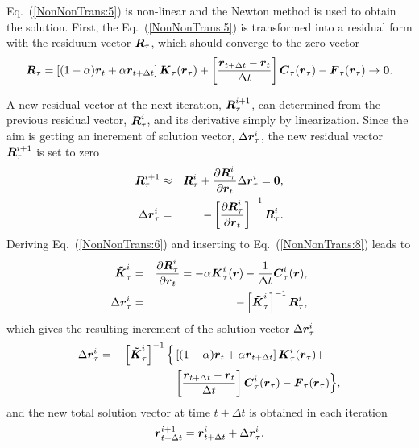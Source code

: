 \documentclass[a4paper]{article}
\newcommand{\mbf}[1]{\mbox{\boldmath$#1$}}
\newcommand{\del}[2]{\mbox{$\displaystyle\frac{#1}{#2}$}}
\newcommand{\refeq}[1]{Eq.~(\ref{#1})}
\begin{document}
\refeq{NonNonTrans:5} is non-linear and the Newton method is used to obtain the solution. First, the \refeq{NonNonTrans:5} is 
transformed into a residual form with the residuum vector $\mbf{R}_{\tau}$, which should converge to the zero vector
\begin{equation}
\mbf{R}_{\tau} = 
\left[(1-\alpha)\mbf{r}_t + \alpha\mbf{r}_{t+\Delta t} \right] \mbf{K}_{\tau}(\mbf{r}_\tau) +
\left[\del{\mbf{r}_{t+\Delta t}-\mbf{r}_t}{\Delta t}\right] \mbf{C}_{\tau}(\mbf{r}_\tau) -
\mbf{F}_{\tau}(\mbf{r}_\tau) \to \mbf{0}.\label{NonNonTrans:6}
\end{equation}

A new residual vector at the next iteration, $\mbf{R}_\tau^{i+1}$, can determined from the previous residual vector, $\mbf{R}_{\tau}^i$, and its derivative simply by linearization. Since the aim is getting an increment of solution vector, $\Delta\mbf{r}_{\tau}^i$, the new residual vector $\mbf{R}_{\tau}^{i+1}$ is set to zero
\begin{eqnarray}
\mbf{R}_\tau^{i+1} &\approx& \mbf{R}_{\tau}^i+\frac{\partial{\mbf{R}_{\tau}^i}}{\partial\mbf{r}_t} \Delta\mbf{r}_{\tau}^i = \mbf{0},\label{NonNonTrans:7}\\
\Delta \mbf{r}_{\tau}^i &=& - \left[\frac{\partial{\mbf{R}_{\tau}^i}}{\partial\mbf{r}_t}\right]^{-1} \mbf{R}_{\tau}^i\label{NonNonTrans:8}.
\end{eqnarray}
Deriving \refeq{NonNonTrans:6} and inserting to \refeq{NonNonTrans:8} leads to
\begin{eqnarray}
\mbf{\tilde K}_\tau^i &=& \frac{\partial{\mbf{R}_{\tau}^i}}{\partial\mbf{r}_t} = -\alpha \mbf{K}_{\tau}^i(\mbf{r}) - \del{1}{\Delta
t}\mbf{C}_{\tau}^i(\mbf{r})\label{NonNonTrans:9},\\
\Delta \mbf{r}_{\tau}^i &=& - \left[\mbf{\tilde K}_\tau^i\right]^{-1} \mbf{R}_{\tau}^i,\label{NonNonTrans:10}
\end{eqnarray}
which gives the resulting increment of the solution vector $\Delta \mbf{r}_{\tau}^i$
\begin{equation}
\begin{split}
\Delta \mbf{r}_{\tau}^i = - \left[\mbf{\tilde K}_\tau^i\right]^{-1} \Big\{ &\left[(1-\alpha)\mbf{r}_t + \alpha\mbf{r}_{t+\Delta t} \right] \mbf{K}_{\tau}^i(\mbf{r}_\tau) +\\
&\left[\del{\mbf{r}_{t+\Delta t}-\mbf{r}_t}{\Delta t}\right] \mbf{C}_{\tau}^i(\mbf{r}_\tau) - \mbf{F}_{\tau}(\mbf{r}_\tau) \Big\},\label{NonNonTrans:11}
\end{split}
\end{equation}
and the new total solution vector at time $t + \Delta t$ is obtained in each iteration
\begin{eqnarray}
\mbf{r}_{t+\Delta t}^{i+1}=\mbf{r}_{t+\Delta t}^{i} + \Delta\mbf{r}_{\tau}^i.\label{NonNonTrans:12}
\end{eqnarray}
\end{document}
